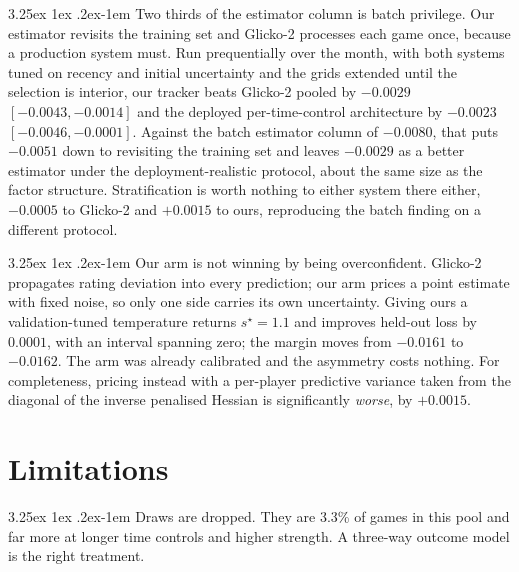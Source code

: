 \documentclass[11pt]{article}
\makeatletter
\renewcommand\paragraph{\@startsection{paragraph}{4}{\z@}%
  {3.25ex \@plus1ex \@minus.2ex}{-1em}%
  {\normalfont\normalsize\itshape}}
\makeatother
\begin{document}
\paragraph{Two thirds of the estimator column is batch privilege.} Our
estimator revisits the training set and Glicko-2 processes each game
once, because a production system must. Run prequentially over the
month, with both systems tuned on recency and initial uncertainty and
the grids extended until the selection is interior, our tracker beats
Glicko-2 pooled by $-0.0029$ $[-0.0043, -0.0014]$ and the deployed
per-time-control architecture by $-0.0023$ $[-0.0046, -0.0001]$.
Against the batch estimator column of $-0.0080$, that puts $-0.0051$
down to revisiting the training set and leaves $-0.0029$ as a better
estimator under the deployment-realistic protocol, about the same size
as the factor structure. Stratification is worth nothing to either
system there either, $-0.0005$ to Glicko-2 and $+0.0015$ to ours,
reproducing the batch finding on a different protocol.

\paragraph{Our arm is not winning by being overconfident.} Glicko-2
propagates rating deviation into every prediction; our arm prices a
point estimate with fixed noise, so only one side carries its own
uncertainty. Giving ours a validation-tuned temperature returns
$s^\star = 1.1$ and improves held-out loss by $0.0001$, with an
interval spanning zero; the margin moves from $-0.0161$ to $-0.0162$.
The arm was already calibrated and the asymmetry costs nothing. For
completeness, pricing instead with a per-player predictive variance
taken from the diagonal of the inverse penalised Hessian is
significantly \emph{worse}, by $+0.0015$.

\section{Limitations}

\paragraph{Draws are dropped.} They are 3.3\% of games in this pool and far more at
longer time controls and higher strength. A three-way outcome model
is the right treatment.
\end{document}
